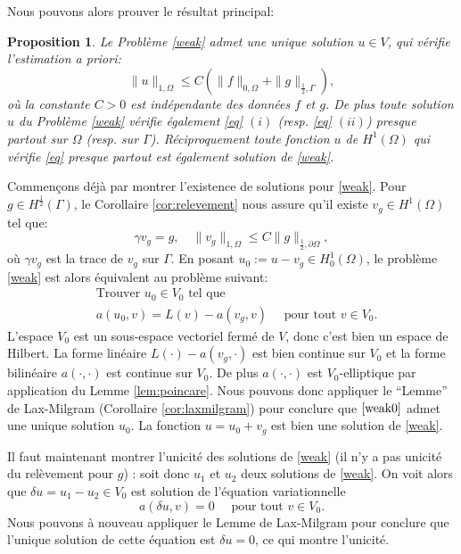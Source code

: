 \documentclass[11pt]{book}
\newtheorem{proposition}[theorem]{Proposition}
\newcommand{\bp}{\begin{proposition}}
\newcommand{\ep}{\end{proposition}}
\begin{document}
Nous pouvons alors prouver le résultat principal:

\bp \label{weak:wellposed}
Le Problème \eqref{weak} admet une unique solution $u \in V$, qui vérifie l'estimation \emph{ a priori}:
\begin{equation} \label{eq:estimP}
 \| u \|_{1,\Omega} \leq C \left ( \| f \|_{0,\Omega} + \| g \|_{\frac12,\Gamma} \right ),
\end{equation}
où la constante $C > 0$ est indépendante des données $f$ et $g$. De plus
toute solution $u$ du Problème \eqref{weak} vérifie également \eqref{eq} $(i)$ (resp. \eqref{eq} $(ii)$) presque partout sur $\Omega$ (resp. sur $\Gamma$). Réciproquement toute fonction $u$ de $H^1(\Omega)$ qui vérifie \eqref{eq} presque partout est également solution de \eqref{weak}. 
\ep

\proof Commençons déjà par montrer l'existence de solutions pour \eqref{weak}.
Pour $g \in H^{\frac12}(\Gamma)$, le Corollaire \ref{cor:relevement} nous assure qu'il existe $v_g \in H^1(\Omega)$ tel que:
\begin{equation} \label{estimRel}
\gamma v_g  = g, \quad \| v_g \|_{1,\Omega} \leq C \| g \|_{\frac12,\partial \Omega},
\end{equation}
où $\gamma v_g$ est la trace de $v_g$ sur $\Gamma$. En posant $u_0 := u - v_g \in H^1_0(\Omega)$, le problème \eqref{weak} est alors équivalent au problème suivant:
\begin{align} 
\label{weak0}
&\mbox{Trouver } u_0\in V_0 \mbox{ tel que }\nonumber\\
&
a(u_0,v) = L(v) - a ( v_g , v) \quad \textrm{ pour tout } v \in V_0.
\end{align}
L'espace $V_0$ est un sous-espace vectoriel fermé de $V$, donc c'est bien un espace de Hilbert.
La forme linéaire $L(\cdot) - a ( v_g , \cdot)$ est bien continue sur $V_0$ et la forme bilinéaire $a(\cdot,\cdot)$ est continue sur $V_0$. De plus $a(\cdot,\cdot)$ est $V_0$-elliptique par application %
du Lemme \ref{lem:poincare}. Nous pouvons donc appliquer le ``Lemme'' de Lax-Milgram (Corollaire \ref{cor:laxmilgram}) pour conclure que $\eqref{weak0}$ admet une unique solution $u_0$. La fonction $u = u_0 + v_g$ est bien une solution de \eqref{weak}.

Il faut maintenant montrer l'unicité des solutions de \eqref{weak} (il n'y a pas unicité du relèvement pour $g$) : soit donc $u_1$ et $u_2$ deux solutions de \eqref{weak}. On voit alors que $\delta u =  u_1 - u_2 \in V_0$ est solution de l'équation variationnelle
\[
a(\delta u,v) = 0 \quad \textrm{ pour tout } v \in V_0. 
\]
Nous pouvons à nouveau appliquer le Lemme de Lax-Milgram pour conclure que l'unique solution de cette équation est $\delta u =0$, ce qui montre l'unicité.
\end{document}
